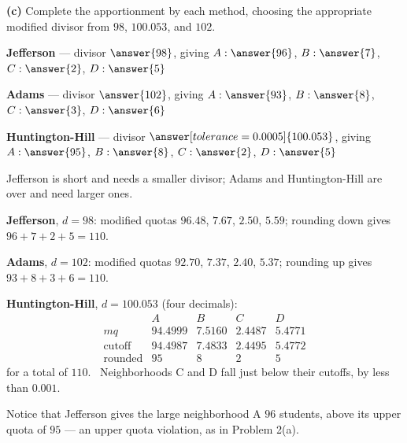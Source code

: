 \documentclass[12pt]{ximera}
\begin{document}
\begin{problem}
\begin{prompt}
\textbf{(c)} Complete the apportionment by each method, choosing the appropriate modified
divisor from $98$, $100.053$, and $102$.

\textbf{Jefferson} --- divisor $\answer{98}$, giving $A: \answer{96}$, $B: \answer{7}$,
$C: \answer{2}$, $D: \answer{5}$

\smallskip
\textbf{Adams} --- divisor $\answer{102}$, giving $A: \answer{93}$, $B: \answer{8}$,
$C: \answer{3}$, $D: \answer{6}$

\smallskip
\textbf{Huntington-Hill} --- divisor $\answer[tolerance=0.0005]{100.053}$, giving
$A: \answer{95}$, $B: \answer{8}$, $C: \answer{2}$, $D: \answer{5}$

\begin{hint}
Jefferson is short and needs a smaller divisor; Adams and Huntington-Hill are over and
need larger ones.
\end{hint}

\begin{feedback}
\textbf{Jefferson}, $d=98$: modified quotas $96.48$, $7.67$, $2.50$, $5.59$; rounding
down gives $96+7+2+5=110$. \checkmark

\textbf{Adams}, $d=102$: modified quotas $92.70$, $7.37$, $2.40$, $5.37$; rounding up
gives $93+8+3+6=110$. \checkmark

\textbf{Huntington-Hill}, $d=100.053$ (four decimals):
\[
\begin{array}{lcccc}
 & A & B & C & D\\
mq & 94.4999 & 7.5160 & 2.4487 & 5.4771\\
\text{cutoff} & 94.4987 & 7.4833 & 2.4495 & 5.4772\\
\text{rounded} & 95 & 8 & 2 & 5
\end{array}
\]
for a total of $110$. \checkmark\ Neighborhoods C and D fall just below their cutoffs,
by less than $0.001$.

Notice that Jefferson gives the large neighborhood A $96$ students, above its upper
quota of $95$ --- an upper quota violation, as in Problem 2(a).
\end{feedback}
\end{prompt}
\end{problem}
\end{document}
